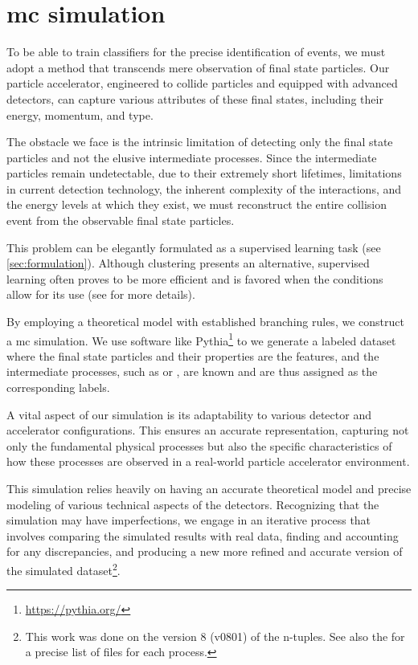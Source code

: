 
\section[Monte Carlo simulation]{\gls{mc} simulation}
\label{sec:mc}

To be able to train classifiers for the precise identification of \tth events, we must adopt a method that transcends
mere observation of final state particles. Our particle accelerator, engineered to collide particles and equipped with
advanced detectors, can capture various attributes of these final states, including their energy, momentum, and type.

The obstacle we face is the intrinsic limitation of detecting only the final state particles and not the elusive
intermediate processes. Since the intermediate particles remain undetectable, due to their extremely short lifetimes,
limitations in current detection technology, the inherent complexity of the interactions, and the energy levels at which
they exist, we must reconstruct the entire collision event from the observable final state particles.

This problem can be elegantly formulated as a supervised learning task (see \autoref{sec:formulation}). Although
clustering presents an alternative, supervised learning often proves to be more efficient and is favored when the
conditions allow for its use (see  for more details).

By employing a theoretical model with established branching rules, we construct a \gls{mc} simulation.  We use software
like Pythia\footnote{\url{https://pythia.org/}} to we generate a labeled dataset where the
final state particles and their properties are the features, and the intermediate processes, such as \tth or \ttw, are
known and are thus assigned as the corresponding labels.

A vital aspect of our simulation is its adaptability to various detector and accelerator configurations. This ensures an
accurate representation, capturing not only the fundamental physical processes but also the specific characteristics of
how these processes are observed in a real-world particle accelerator environment.

This simulation relies heavily on having an accurate theoretical model and precise modeling of various technical aspects
of the detectors. Recognizing that the simulation may have imperfections, we engage in an iterative process that
involves comparing the simulated results with real data, finding and accounting for any discrepancies, and producing a
new more refined and accurate version of the simulated dataset\footnote{This work was done on the version 8 (v0801) of
    the n-tuples. See also the  for a precise list of files for each process.}.




